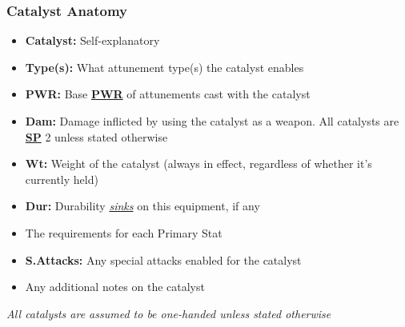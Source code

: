 \documentclass[12pt]{article}
\newcommand{\refto}[1]{\hyperlink{#1}{\textbf{#1}}}
\newcommand{\reftoit}[1]{\hyperlink{#1}{\emph{#1}}}
\begin{document}
\subsubsection*{Catalyst Anatomy}
\begin{itemize}
\item \textbf{Catalyst:} Self-explanatory
\item \textbf{Type(s):} What attunement type(s) the catalyst enables
\item \textbf{PWR:} Base \refto{PWR} of attunements cast with the catalyst
\item \textbf{Dam:} Damage inflicted by using the catalyst as a weapon. All catalysts are \refto{SP} 2 unless stated otherwise
\item \textbf{Wt:} Weight of the catalyst (always in effect, regardless of whether it’s currently held)
\item \textbf{Dur:} Durability \reftoit{sinks} on this equipment, if any
\item The requirements for each Primary Stat
\item \textbf{S.Attacks:} Any special attacks enabled for the catalyst
\item Any additional notes on the catalyst
\end{itemize}
\emph{All catalysts are assumed to be one-handed unless stated otherwise}
\end{document}
